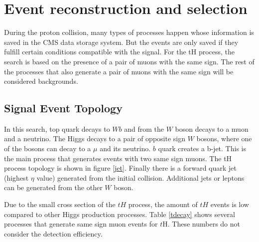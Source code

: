 \chapter{Event reconstruction and selection}
During the proton collision, many types of processes happen whose information is saved in the CMS data storage system. But the events are only saved if they fulfill certain conditions compatible with the signal. 
For the tH process, the search is based on the presence of a pair of muons with the same sign. The rest of the processes that also generate a pair of muons with the same sign will be considered backgrounds. 
\section{Signal Event Topology} 
In this search, top quark decays to $Wb$ and from the $W$ boson decays to a muon and a neutrino. The Higgs decays to a pair of opposite sign $W$ bosons, where one of the bosons can decay to a $\mu$ and its neutrino. $b$ quark creates a b-jet. This is the main process that generates events with two same sign muons. The tH process topology is shown in  figure \ref{jet}.
 Finally there is a forward quark jet (highest $\eta$ value) generated from the initial collision. Additional jets or leptons can be generated from the other $W$ boson.
	
Due to the small cross section of the $tH$ process, the amount of $tH$ events is low compared to other Higgs production processes. 
Table \ref{tdecay} shows several processes that generate same sign muon events for $t$H. These numbers do not consider the detection efficiency.
\pagebreak


